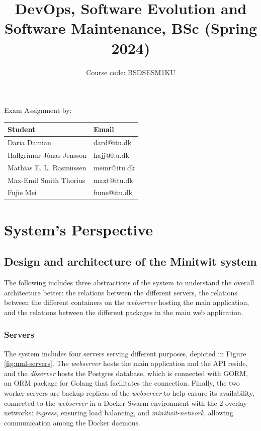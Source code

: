 \documentclass[12pt, a4paper, oneside]{book}
\title{DevOps, Software Evolution and Software Maintenance, BSc (Spring 2024)}
\author{Course code: BSDSESM1KU}
\begin{document}
\begin{minipage}{\textwidth}
\maketitle

\begin{center}
    Exam Assignment by: \\
    \hfill \break
    \bgroup
    \def\arraystretch{1.5}%
    \begin{tabularx}{0.8\textwidth} { 
      | >{\centering\arraybackslash}X 
      | >{\centering\arraybackslash}X | }
     \hline
     \cellcolor[HTML]{EFEFEF} Student & \cellcolor[HTML]{EFEFEF} Email \\
     \hline
     Daria Damian & dard@itu.dk \\
     \hline
     Hallgrímur Jónas Jensson & hajj@itu.dk \\
    \hline
     Mathias E. L. Rasmussen & memr@itu.dk \\
    \hline
     Max-Emil Smith Thorius & maxt@itu.dk \\
    \hline
    Fujie Mei & fume@itu.dk \\
    \hline
    \end{tabularx}
    \egroup
\end{center}
\end{minipage}

\tableofcontents

\chapter{System's Perspective}
\label{chap:System's Perspective}

\section{Design and architecture of the Minitwit system}
\label{sec:Design and architecture of the Minitwit system}

The following includes three abstractions of the system to understand the overall architecture better: the relations between the different servers, the relations between the different containers on the \textit{webserver} hosting the main application, and the relations between the different packages in the main web application.

\subsection{Servers}
The system includes four servers serving different purposes, depicted in Figure \ref{fig:uml-servers}.
The \textit{webserver} hosts the main application and the API reside, and the \textit{dbserver} hosts the Postgres database, which is connected with GORM, an ORM package for Golang that facilitates the connection.
Finally, the two worker servers are backup replicas of the \textit{webserver} to help ensure its availability, connected to the \textit{webserver} in a Docker Swarm environment with the 2 overlay networks: \textit{ingress}, ensuring load balancing, and \textit{minitwit-network}, allowing communication among the Docker daemons.
\end{document}
